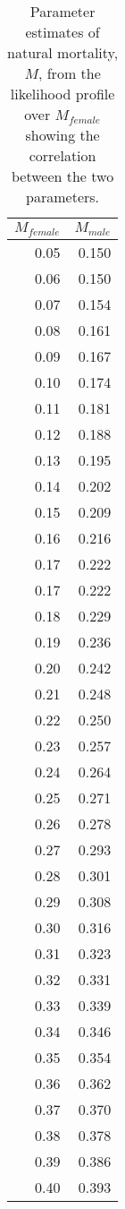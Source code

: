 \begin{table}[H]

\caption{\label{tab:profile-M}Parameter estimates of natural mortality, $M$, from the likelihood profile over $M_{female}$ showing the correlation between the two parameters.}
\centering
\begin{tabular}[t]{rr}
\toprule
$M_{female}$ & $M_{male}$\\
\midrule
0.05 & 0.150\\
0.06 & 0.150\\
0.07 & 0.154\\
0.08 & 0.161\\
0.09 & 0.167\\
0.10 & 0.174\\
0.11 & 0.181\\
0.12 & 0.188\\
0.13 & 0.195\\
0.14 & 0.202\\
0.15 & 0.209\\
0.16 & 0.216\\
0.17 & 0.222\\
0.17 & 0.222\\
0.18 & 0.229\\
0.19 & 0.236\\
0.20 & 0.242\\
0.21 & 0.248\\
0.22 & 0.250\\
0.23 & 0.257\\
0.24 & 0.264\\
0.25 & 0.271\\
0.26 & 0.278\\
0.27 & 0.293\\
0.28 & 0.301\\
0.29 & 0.308\\
0.30 & 0.316\\
0.31 & 0.323\\
0.32 & 0.331\\
0.33 & 0.339\\
0.34 & 0.346\\
0.35 & 0.354\\
0.36 & 0.362\\
0.37 & 0.370\\
0.38 & 0.378\\
0.39 & 0.386\\
0.40 & 0.393\\
\bottomrule
\end{tabular}
\end{table}
